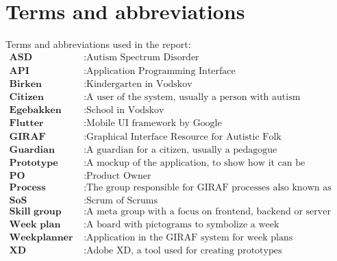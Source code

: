 \chapter*{Terms and abbreviations}
Terms and abbreviations used in the report:
\begin{align*}
    \textbf{ASD} &: \text{Autism Spectrum Disorder} \\
    \textbf{API} &: \text{Application Programming Interface} \\
    \textbf{Birken} &: \text{Kindergarten in Vodskov} \\
    \textbf{Citizen} &: \text{A user of the system, usually a person with autism} \\
    \textbf{Egebakken} &: \text{School in Vodskov} \\
    \textbf{Flutter} &: \text{Mobile UI framework by Google} \\
    \textbf{GIRAF} &: \text{Graphical Interface Resource for Autistic Folk} \\
    \textbf{Guardian} &: \text{A guardian for a citizen, usually a pedagogue} \\
    \textbf{Prototype} &: \text{A mockup of the application, to show how it can be implemented} \\
    \textbf{PO} &: \text{Product Owner} \\
    \textbf{Process group} &: \text{The group responsible for GIRAF processes also known as scrum group} \\
    \textbf{SoS} &: \text{Scrum of Scrums} \\
    \textbf{Skill group} &: \text{A meta group with a focus on frontend, backend or server} \\
    \textbf{Week plan} &: \text{A board with pictograms to symbolize a week} \\
    \textbf{Weekplanner} &: \text{Application in the GIRAF system for week plans} \\
    \textbf{XD} &: \text{Adobe XD, a tool used for creating prototypes} \\
\end{align*}
